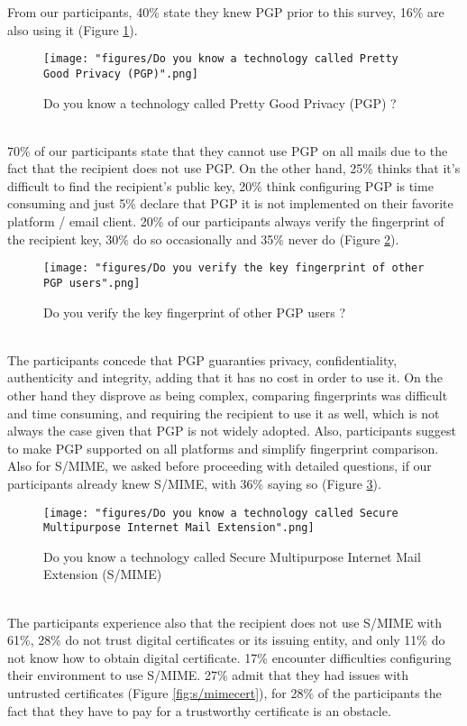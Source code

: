 From our participants, 40\% state they knew PGP prior to this survey, 16\% are also using it (Figure \ref{fig:pgp}).\\
\begin{figure}
	\texttt{[image: "figures/Do you know a technology called Pretty Good Privacy (PGP)".png]}
	\centering
	\caption{Do you know a technology called Pretty Good Privacy (PGP) ?}
	\label{fig:pgp}
\end{figure}\\
70\% of our participants state that they cannot use PGP on all mails due to the fact that the recipient does not use PGP. On the other hand, 25\% thinks that it's difficult to find the recipient's public key, 20\% think configuring PGP is time consuming and just 5\% declare that PGP it is not implemented on their favorite platform / email client. 20\% of our participants always verify the fingerprint of the recipient key, 30\% do so occasionally and 35\% never do (Figure \ref{fig:fingerprintpgp}).\\
\begin{figure}
	\texttt{[image: "figures/Do you verify the key fingerprint of other PGP users".png]}
	\centering
	\caption{Do you verify the key fingerprint of other PGP users ?}
	\label{fig:fingerprintpgp}
\end{figure}\\
The participants concede that PGP guaranties privacy, confidentiality, authenticity and integrity, adding that it has no cost in order to use it. On the other hand they disprove as being complex, comparing fingerprints was difficult and time consuming, and requiring the recipient to use it as well, which is not always the case given that PGP is not widely adopted.
Also, participants suggest to make PGP supported on all platforms and simplify fingerprint comparison.\\
Also for S/MIME, we asked before proceeding with detailed questions, if our participants already knew S/MIME, with 36\% saying so (Figure \ref{fig:s/mime}).\\
\begin{figure}
	\texttt{[image: "figures/Do you know a technology called Secure Multipurpose Internet Mail Extension".png]}
	\centering
	\caption{Do you know a technology called Secure Multipurpose Internet Mail Extension (S/MIME)}
	\label{fig:s/mime}
\end{figure}\\
The participants experience also that the recipient does not use S/MIME with 61\%, 28\% do not trust digital certificates or its issuing entity, and only 11\% do not know how to obtain digital certificate. 17\% encounter difficulties configuring their environment to use S/MIME. 27\% admit that they had issues with untrusted certificates (Figure \ref{fig:s/mimecert}), for 28\% of the participants the fact that they have to pay for a trustworthy certificate is an obstacle.\\
